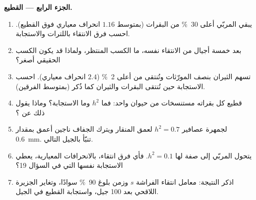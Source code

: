 \begin{problem}
\medskip
\noindent\textbf{الجزء الرابع --- القطيع.}
\begin{enumerate}[resume]
  \item يبقي المربّي أعلى \qty{30}{\%} من البقرات (بمتوسط $1.16$
        انحراف معياري فوق القطيع). احسب فرق
        الانتقاء باللترات والاستجابة.
  \item بعد خمسة أجيال من الانتقاء نفسه، ما الكسب
        المنتظر، ولماذا قد يكون الكسب الحقيقي أصغر؟
  \item تسهم الثيران بنصف المورّثات وتُنتقى من أعلى
        \qty{2}{\%} ($2.4$ انحراف معياري). احسب الاستجابة
        حين تُنتقى البقرات والثيران كما ذُكر (بمتوسط الفرقين).
  \item قطيع كل بقراته مستنسخات من حيوان واحد: فما
        $h^{2}$ وما الاستجابة؟ وماذا يقول ذلك عن
        ؟
  \item لجمهرة عصافير $h^{2} = 0.7$ لعمق المنقار ويترك
        الجفاف ناجين أعمق بمقدار \qty{0.6}{mm}. تنبّأ
        بالجيل التالي.
  \item يتحول المربّي إلى صفة لها $h^{2} = 0.1$. فأي
        فرق انتقاء، بالانحرافات المعيارية، يعطي
        الاستجابة نفسها التي في السؤال 19؟
  \item اذكر النتيجة: معامل انتقاء الفراشة $s$ وزمن بلوغ \qty{90}{\%}
        سوادًا، وتغاير الجزيرة اللاقحي بعد 100 جيل،
        واستجابة القطيع في الجيل.
\end{enumerate}
\end{problem}
